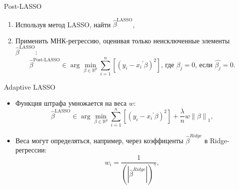 \documentclass[c, dvipsnames]{beamer}  %
\begin{document}
\begin{frame}[shink=20]
\frametitle{\insertsection} 
\framesubtitle{\insertsubsection}
\begin{block}{Post-LASSO}
\begin{enumerate}
    \item Используя метод LASSO, найти $\hat{\beta}^{\text{LASSO}}$,
    \item Применить МНК-регрессию, оценивая только неисключенные элементы $\hat{\beta}^{\text{LASSO}}$:
    \begin{equation}
  \hat{\beta}^{\text{Post-LASSO}} \in \arg \min_{\beta \in
\mathbb{R}^p} \sum_{i=1}^n \left[ (y_i - {x_i}^{'} \beta)^2 \right] \text{,  где }  \beta_j = 0 \text{, если } \hat{\beta_j} = 0.
\end{equation}
\end{enumerate}
\end{block}


\begin{block}{Adaptive LASSO}
\begin{itemize}
    \item Функция штрафа умножается на веса $w$:
     \begin{equation}
  \hat{\beta}^{\text{LASSO}} \in \arg \min_{\beta \in
\mathbb{R}^p} \sum_{i=1}^n \left[ (y_i - {x_i}^{'} \beta)^2 \right] +  \frac{\lambda}{n} w \left\lVert \beta \right\rVert_1,
\end{equation}
\item Веса могут определяться, например, через коэффиценты $\hat{\beta}^{Ridge}$ в Ridge-регрессии:
\begin{equation}
    w_i = \frac{1}{\left(|\hat{\beta}^{Ridge}|\right)^{\gamma}},
\end{equation}
\end{itemize}
\end{block}
\end{frame}
\end{document}
